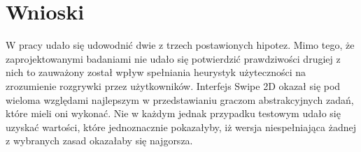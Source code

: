 \documentclass[a4paper,12pt,numbers=noenddot]{report}
\begin{document}
\chapter{Wnioski}

W pracy udało się udowodnić dwie z trzech postawionych hipotez. Mimo tego, że zaprojektowanymi badaniami nie udało się potwierdzić prawdziwości drugiej z nich to zauważony został wpływ spełniania heurystyk użyteczności na zrozumienie rozgrywki przez użytkowników. Interfejs Swipe 2D okazał się pod wieloma względami najlepszym w przedstawianiu graczom abstrakcyjnych zadań, które mieli oni wykonać. Nie w każdym jednak przypadku testowym udało się uzyskać wartości, które jednoznacznie pokazałyby, iż wersja niespełniająca żadnej z wybranych zasad okazałaby się najgorsza. \\
\end{document}
